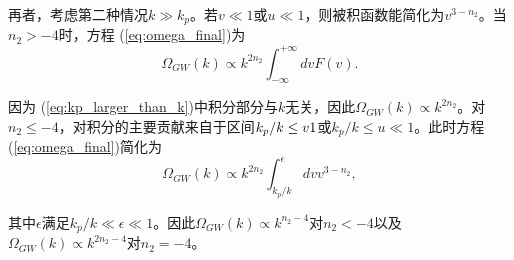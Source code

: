 再者，考虑第二种情况$k\gg k_p$。若$v\ll 1$或$u\ll
1$，则被积函数能简化为$v^{3-n_2}$。当$n_2 > -4$时，方程
(\ref{eq:omega_final})为
\begin{equation}\label{eq:kp_larger_than_k}
    \Omega_{GW}(k)\propto k^{2n_2}\int_{-\infty}^{+\infty} dv F(v).
\end{equation}

因为
(\ref{eq:kp_larger_than_k})中积分部分与$k$无关，因此$\Omega_{GW}(k)\propto
k^{2n_2}$。对$n_2\le -4$，对积分的主要贡献来自于区间$k_p/k \le v \\
1$或$k_p/k\le u \ll 1$。此时方程 (\ref{eq:omega_final})简化为
\begin{equation}
    \Omega_{GW}(k) \propto k^{2n_2}\int_{k_p/k}^{\epsilon} dv v^{3-n_2},
\end{equation}

其中$\epsilon$满足$k_p/k\ll \epsilon \ll 1$。因此$\Omega_{GW}(k)\propto
k^{n_2-4}$对$n_2 < -4$以及$\Omega_{GW}(k)\propto k^{2n_2-4}$对$n_2=-4$。
